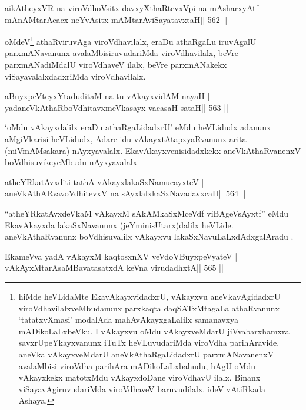 \begin{shl}
aikAtheyxVR na viroVdhoV\s sitx davxyXthaRtevxV\s pi na mAsharxyAtf |
mAnAMtarAcacx neYvAsitx mAMtarAviSayatavxtaH\hfill || 562 ||
\end{shl}

\begin{artha}
oMdeV\footnote{hiMde heVLidaMte EkavAkayxvidadxrU, vAkayxvu
  aneVkavAgidadxrU viroVdhavilalxveMbudanunx parxkaqta daqSATxMtagaLa
  athaRvanunx `tatatxvXmasi' modalAda mahAvAkayxgaLalilx samanavxya
  mADikoLaLxbeVku. I vAkayxvu oMdu vAkayxveMdarU jiVvabarxhamxra
  savxrUpeYkayxvanunx iTuTx heVLuvudariMda viroVdha parihAravide.
  aneVka vAkayxveMdarU aneVkAthaRgaLidadxrU parxmANavanenxV avalaMbisi
  viroVdha parihAra mADikoLaLxbahudu, hAgU oMdu vAkayxkekx matotxMdu
  vAkayxdoDane viroVdhavU ilalx. Binanx viSayavAgiruvudariMda
  viroVdhaveV baruvudilalx. ideV vAtiRkada Ashaya.} athaRviruvAga viroVdhavilalx, eraDu athaRgaLu iruvAgalU
parxmANavanunx avalaMbisiruvudariMda viroVdhavilalx, beVre
parxmANadiMdalU viroVdhaveV ilalx, beVre parxmANakekx
viSayavalalxdadxriMda viroVdhavilalx.
\end{artha}

\begin{shl}
aBuyxpeVteyxYtaduditaM na tu vAkayxvidAM nayaH |
yadaneVkAthaRboVdhitavxmeVkasayx vacasaH sataH\hfill || 563 ||
\end{shl}

\begin{artha}
`oMdu vAkayxdalilx eraDu athaRgaLidadxrU' eMdu heVLidudx adanunx
  aMgiVkarisi heVLidudx, Adare idu vAkayxtAtapxyaRvanunx arita
  (miVmAMsakara) nAyxyavalalx. EkavAkayxvenisidadxkekx
  aneVkAthaRvanenxV boVdhisuvikeyeMbudu nAyxyavalalx |
\end{artha}



\begin{shl}
atheYRkatAvxditi tathA vAkayxlakaSxNamucayxteV |
aneVkAthARvavoVdhitevxV na sAyxlalxkaSxNavadavxcaH\hfill || 564 ||
\end{shl}

\begin{artha}
``atheYRkatAvxdeVkaM vAkayxM sAkAMkaSxMceVdf viBAgeVsAyxtf'' eMdu   EkavAkayxda lakaSxNavanunx (jeYminisUtarx)dalilx heVLide.   aneVkAthaRvanunx boVdhisuvalilx vAkayxvu lakaSxNavuLaLxdAdxgalAradu   .
\end{artha}

\begin{shl}
EkameVva yadA vAkayxM kaqtosxnXV veVdoV\s BuyxpeVyateV |
vAkAyxMtarAsaMBavatasatxdA keVna virudadhxtA\hfill || 565 ||
\end{shl}

